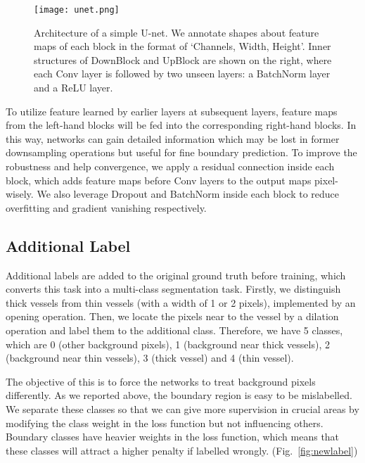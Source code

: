 \documentclass[runningheads,a4paper]{llncs}
\begin{document}
\begin{figure}[h]
	\centering
	\vspace{-15pt}
	\texttt{[image: unet.png]}
	\vspace{-5pt}
	\caption{Architecture of a simple U-net. We annotate shapes about feature maps of each block in the format of `Channels, Width, Height'. Inner structures of DownBlock and UpBlock are shown on the right, where each Conv layer is followed by two unseen layers: a BatchNorm layer and a ReLU layer.}
	\vspace{-15pt}
	\label{fig:unet}
\end{figure}

To utilize feature learned by earlier layers at subsequent layers, feature maps from the left-hand blocks will be fed into the corresponding right-hand blocks. In this way, networks can gain detailed information which may be lost in former downsampling operations but useful for fine boundary prediction. To improve the robustness and help convergence, we apply a residual connection \cite{he2016deep} inside each block, which adds feature maps before Conv layers to the output maps pixel-wisely. We also leverage Dropout and BatchNorm inside each block to reduce overfitting and gradient vanishing respectively. 

\subsection{Additional Label}

Additional labels are added to the original ground truth before training, which converts this task into a multi-class segmentation task. Firstly, we distinguish thick vessels from thin vessels (with a width of 1 or 2 pixels), implemented by an opening operation. Then, we locate the pixels near to the vessel by a dilation operation and label them to the additional class. Therefore, we have 5 classes, which are 0 (other background pixels), 1 (background near thick vessels), 2 (background near thin vessels), 3 (thick vessel) and 4 (thin vessel).

The objective of this is to force the networks to treat background pixels differently. As we reported above, the boundary region is easy to be mislabelled. We separate these classes so that we can give more supervision in crucial areas by modifying the class weight in the loss function but not influencing others. Boundary classes have heavier weights in the loss function, which means that these classes will attract a higher penalty if labelled wrongly.  (Fig.~\ref{fig:newlabel})
\end{document}
